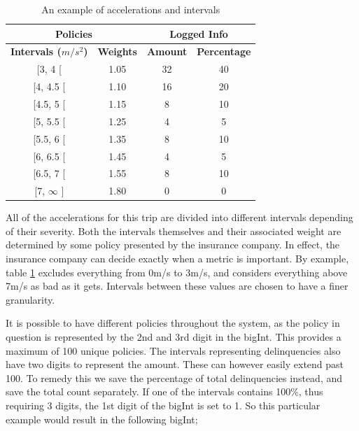 \begin{table}[h]
\centering
\begin{tabular}{cc | cc}
\multicolumn{2}{c}{\textbf{Policies}} & \multicolumn{2}{c}{\textbf{Logged Info}} \\\hline
\textbf{Intervals ($m/s^{2}$)}     & \textbf{Weights}     & \textbf{Amount}     & \textbf{Percentage}     \\\hline
{[}3, 4 {[}              & 1.05              &   32            & 40              \\
{[}4, 4.5 {[}            & 1.10              &   16            & 20              \\
{[}4.5, 5 {[}            & 1.15              &   8             & 10              \\
{[}5, 5.5 {[}            & 1.25              &   4             & 5              \\
{[}5.5, 6 {[}            & 1.35              &   8             & 10              \\
{[}6, 6.5 {[}            & 1.45              &   4             & 5              \\
{[}6.5, 7 {[}            & 1.55              &   8             & 10              \\
{[}7, $\infty$ {]}       & 1.80              &   0             & 0              \\\hline
\end{tabular}
\caption{An example of accelerations and intervals}
\label{tab:intervalexample}
\end{table}

All of the accelerations for this trip are divided into different intervals depending of their severity. Both the intervals themselves and their associated weight are determined by some policy presented by the insurance company. In effect, the insurance company can decide exactly when a metric is important. By example, table \ref{tab:intervalexample} excludes everything from 0m/s to 3m/s, and considers everything above 7m/s as bad as it gets. Intervals between these values are chosen to have a finer granularity.

It is possible to have different policies throughout the system, as the policy in question is represented by the 2nd and 3rd digit in the bigInt. This provides a maximum of 100 unique policies. The intervals representing delinquencies also have two digits to represent the amount. These can however easily extend past 100. To remedy this we save the percentage of total delinquencies instead, and save the total count separately. If one of the intervals contains 100\%, thus requiring 3 digits, the 1st digit of the bigInt is set to 1. So this particular example would result in the following bigInt;

